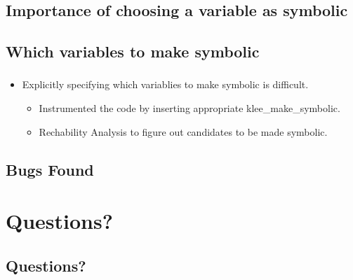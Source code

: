 \documentclass[mathserif,10pt]{beamer}
\newcommand{\cmt}[1]{}
\begin{document}
\subsection{Importance of choosing a variable as symbolic}
\frame
{
  \frametitle{\subsecname}
  \lstI

}

\subsection{Which variables to make symbolic}
\frame
{
  \frametitle{\subsecname}
  \begin{itemize}
    \item Explicitly specifying which variablies to make symbolic is difficult. 
    \begin{itemize}
      \item Instrumented the code by inserting appropriate klee\_make\_symbolic.
      \item Rechability Analysis to figure out candidates to be made symbolic.
    \end{itemize}
  \end{itemize}
  \cmt{
    Rather that explicitly making the  inputs of the test program
      symbolic, let klee instrument the code by inserting klee_make_symbolic
      calls. The inputs that we are considering include command line arguments,
      file inputs, globals and variables used to read inputs (for example using
          scanf).
  }
}


\subsection{Bugs Found}
\frame
{
  \frametitle{\subsecname}
  \lstIII
}

\section{Questions?}
\subsection{Questions?}
\frame
{}
\end{document}
